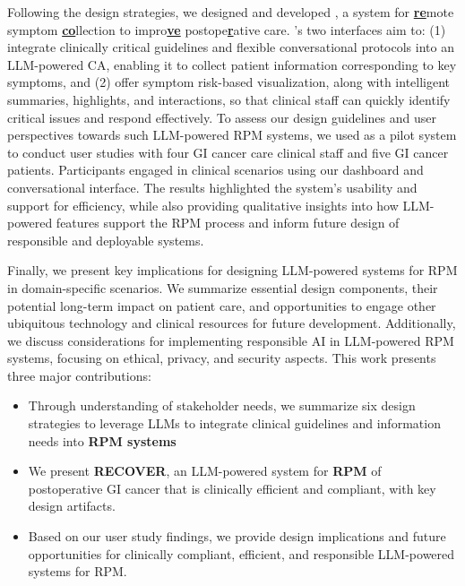 Following the design strategies, we designed and developed \projectname{}, a system for \underline{\textbf{re}}mote symptom \underline{\textbf{co}}llection to impro\underline{\textbf{ve}} postope\underline{\textbf{r}}ative care. 
\projectname{}'s two interfaces aim to: (1) integrate clinically critical guidelines and flexible conversational protocols into an LLM-powered CA, enabling it to collect patient information corresponding to key symptoms, and (2) offer symptom risk-based visualization, along with intelligent summaries, highlights, and interactions, so that clinical staff can quickly identify critical issues and respond effectively. 
To assess our design guidelines and user perspectives towards such LLM-powered RPM systems, we used \projectname{} as a pilot system to conduct user studies with four GI cancer care clinical staff and five GI cancer patients. Participants engaged in clinical scenarios using our dashboard and conversational interface. The results highlighted the system's usability and support for efficiency, while also providing qualitative insights into how LLM-powered features support the RPM process and inform future design of responsible and deployable systems.

Finally, we present key implications for designing LLM-powered systems for RPM in domain-specific scenarios. We summarize essential design components, their potential long-term impact on patient care, and opportunities to engage other ubiquitous technology and clinical resources for future development. Additionally, we discuss considerations for implementing responsible AI in LLM-powered RPM systems, focusing on ethical, privacy, and security aspects.
This work presents three major contributions:
\begin{itemize}
    \item Through understanding of stakeholder needs, we summarize six design strategies to leverage LLMs to integrate clinical guidelines and information needs into \textbf{RPM systems}
    \item We present \textbf{RECOVER}, an LLM-powered system for \textbf{RPM} of postoperative GI cancer that is clinically efficient and compliant, with key design artifacts.
    \item Based on our user study findings, we provide design implications and future opportunities for clinically compliant, efficient, and responsible LLM-powered systems for RPM.
\end{itemize}
